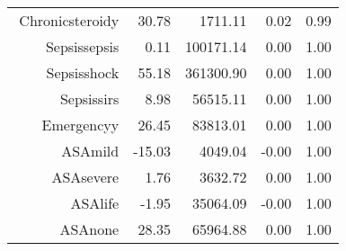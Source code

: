 \begin{tabular}{rrrrr}
$$  Chronic\-steroid\-y & 30.78 & 1711.11 & 0.02 & 0.99 \\ 
  Sepsis\-sepsis & 0.11 & 100171.14 & 0.00 & 1.00 \\ 
  Sepsis\-shock & 55.18 & 361300.90 & 0.00 & 1.00 \\ 
  Sepsis\-sirs & 8.98 & 56515.11 & 0.00 & 1.00 \\ 
  Emergency\-y & 26.45 & 83813.01 & 0.00 & 1.00 \\ 
  ASA\-mild & -15.03 & 4049.04 & -0.00 & 1.00 \\ 
  ASA\-severe & 1.76 & 3632.72 & 0.00 & 1.00 \\ 
  ASA\-life & -1.95 & 35064.09 & -0.00 & 1.00 \\ 
  ASA\-none & 28.35 & 65964.88 & 0.00 & 1.00 \\ 
   \hline
\end{tabular}

